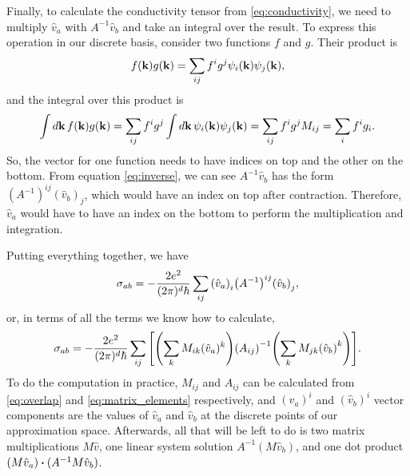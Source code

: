 \documentclass[12pt]{article}
\begin{document}
Finally, to calculate the conductivity tensor from \eqref{eq:conductivity}, we need to multiply
$\hat{v}_a$ with $A^{-1}\hat{v}_b$ and take an integral over the result. To express this operation
in our discrete basis, consider two functions $f$ and $g$. Their product is
\begin{equation}
    f(\vb{k})g(\vb{k}) = \sum_{ij} f^i g^j \psi_i(\vb{k}) \psi_j(\vb{k}),
\end{equation}
and the integral over this product is
\begin{equation}
    \int\dd{\vb{k}} f(\vb{k}) g(\vb{k}) = \sum_{ij} f^i g^j \int\dd{\vb{k}}
    \psi_i(\vb{k})\psi_j(\vb{k}) = \sum_{ij} f^i g^j M_{ij} = \sum_i f^i g_i.
\end{equation}
So, the vector for one function needs to have indices on top and the other on the bottom. From
equation \eqref{eq:inverse}, we can see $A^{-1}\hat{v}_b$ has the form
$(A^{-1})^{ij} (\hat{v}_b)_j$, which would have an index on top after contraction. Therefore,
$\hat{v}_a$ would have to have an index on the bottom to perform the multiplication and integration.

Putting everything together, we have
\begin{equation}
    \sigma_{ab} = -\frac{2e^2}{(2\pi)^d\hbar} \sum_{ij} \qty(\hat{v}_a)_i
    \qty(A^{-1})^{ij} \qty(\hat{v}_b)_j,
\end{equation}
or, in terms of all the terms we know how to calculate,
\begin{equation}
    \sigma_{ab} = -\frac{2e^2}{(2\pi)^d\hbar} \sum_{ij} \qty[
    \qty(\sum_k M_{ik} (\hat{v}_a)^k) \qty(A_{ij})^{-1} \qty(\sum_k M_{jk} \qty(\hat{v}_b)^k)].
\end{equation}
To do the computation in practice, $M_{ij}$ and $A_{ij}$ can be calculated from \eqref{eq:overlap}
and \eqref{eq:matrix_elements} respectively, and $(\hat{v}_a)^i$ and $(\hat{v}_b)^i$ vector
components are the values of $\hat{v}_a$ and $\hat{v}_b$ at the discrete points of our approximation
space.  Afterwards, all that will be left to do is two matrix multiplications $M\hat{v}$, one linear
system solution $A^{-1}(M\hat{v}_b)$, and one dot product $(M\hat{v}_a)\vdot(A^{-1}M\hat{v}_b)$.
\end{document}
